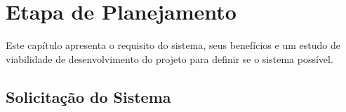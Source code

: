 

\chapter{Etapa de Planejamento}


Este capítulo apresenta o requisito do sistema, seus benefícios e um estudo de viabilidade de desenvolvimento do projeto para definir se o sistema possível.


\section{Solicita\c{c}\~{a}o do Sistema}


